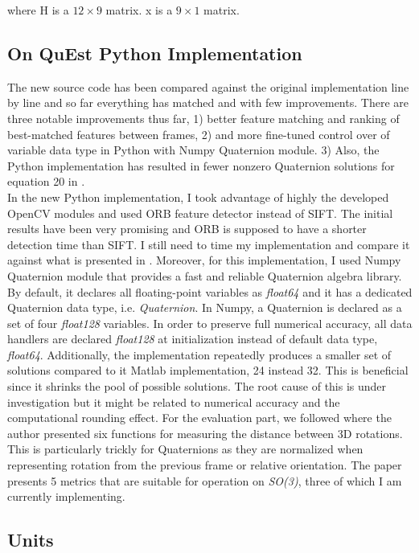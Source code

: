 \documentclass[letterpaper, 10 pt, conference]{ieeeconf}  %
\begin{document}
\noindent
where H is a \(12 \times 9\) matrix. x is a \(9 \times 1\) matrix.




\subsection{On QuEst Python Implementation}
The new source code has been compared against the original implementation line by line
and so far everything has matched and with few improvements. There are
three notable improvements thus far, 1) better feature matching and ranking
of best-matched features between frames, 2) and more fine-tuned control
over of variable data type in Python with Numpy Quaternion module. 3) Also,
the Python implementation has resulted in fewer nonzero Quaternion solutions
for equation 20 in \cite{quest}.\\
In the new Python implementation, I took advantage of highly the developed
OpenCV modules and used ORB feature detector instead of SIFT. The initial
results have been very promising and ORB is supposed to have a shorter
detection time than SIFT. I still need to time my implementation and
compare it against what is presented in \cite{quest}. Moreover, for this
implementation, I used Numpy Quaternion module that provides a fast and
reliable Quaternion algebra library. By default, it declares all
floating-point variables as \emph{float64} and it has a dedicated Quaternion data
type, i.e. \emph{Quaternion}. In Numpy, a Quaternion is declared as a set
of four \emph{float128} variables. In order to preserve full numerical
accuracy, all data handlers are declared \emph{float128} at initialization
instead of default data type, \emph{float64}. Additionally, the
implementation repeatedly produces a smaller set of solutions compared to
it Matlab implementation, 24 instead 32. This is beneficial since it shrinks
the pool of possible solutions. The root cause of this is under
investigation but it might be related to numerical accuracy and the
computational rounding effect.
For the evaluation part, we followed \cite{huynh2009metrics}
where the author presented six functions for measuring the distance between 3D
rotations. This is particularly trickly for Quaternions as they are
normalized when representing rotation from the previous frame or relative
orientation. The paper presents 5 metrics that are suitable for operation
on \emph{SO(3)}, three of which I am currently implementing.\\


\subsection{Units}
\end{document}
